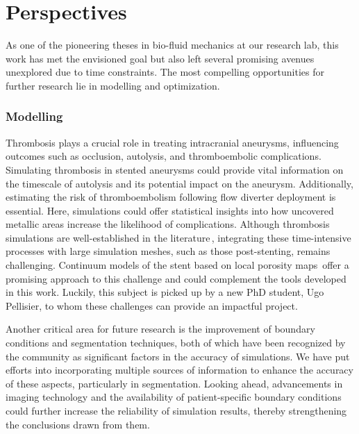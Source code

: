 \section{Perspectives}

As one of the pioneering theses in bio-fluid mechanics at our research lab, this work has met the envisioned goal but also left several promising avenues unexplored due to time constraints. The most compelling opportunities for further research lie in modelling and optimization.

\subsubsection*{Modelling}
Thrombosis plays a crucial role in treating intracranial aneurysms, influencing outcomes such as occlusion, autolysis, and thromboembolic complications. Simulating thrombosis in stented aneurysms could provide vital information on the timescale of autolysis and its potential impact on the aneurysm. Additionally, estimating the risk of thromboembolism following flow diverter deployment is essential. Here, simulations could offer statistical insights into how uncovered metallic areas increase the likelihood of complications. Although thrombosis simulations are well-established in the literature\,\cite{Wu2017, Qu2022}, integrating these time-intensive processes with large simulation meshes, such as those post-stenting, remains challenging. Continuum models of the stent based on local porosity maps\,\cite{Abdehkakha2021} offer a promising approach to this challenge and could complement the tools developed in this work. Luckily, this subject is picked up by a new PhD student, Ugo Pellisier, to whom these challenges can provide an impactful project.

Another critical area for future research is the improvement of boundary conditions and segmentation techniques, both of which have been recognized by the community as significant factors in the accuracy of simulations. We have put efforts into incorporating multiple sources of information to enhance the accuracy of these aspects, particularly in segmentation. Looking ahead, advancements in imaging technology and the availability of patient-specific boundary conditions could further increase the reliability of simulation results, thereby strengthening the conclusions drawn from them.

